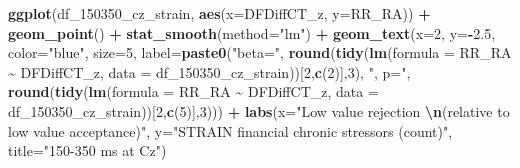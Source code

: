 \documentclass[
]{article}
\newenvironment{Shaded}{\begin{snugshade}}{\end{snugshade}}
\newcommand{\AttributeTok}[1]{\textcolor[rgb]{0.13,0.29,0.53}{#1}}
\newcommand{\DecValTok}[1]{\textcolor[rgb]{0.00,0.00,0.81}{#1}}
\newcommand{\FloatTok}[1]{\textcolor[rgb]{0.00,0.00,0.81}{#1}}
\newcommand{\FunctionTok}[1]{\textcolor[rgb]{0.13,0.29,0.53}{\textbf{#1}}}
\newcommand{\NormalTok}[1]{#1}
\newcommand{\SpecialCharTok}[1]{\textcolor[rgb]{0.81,0.36,0.00}{\textbf{#1}}}
\newcommand{\StringTok}[1]{\textcolor[rgb]{0.31,0.60,0.02}{#1}}
\begin{document}
\begin{Shaded}
\begin{Highlighting}[]
\FunctionTok{ggplot}\NormalTok{(df\_150350\_cz\_strain, }\FunctionTok{aes}\NormalTok{(}\AttributeTok{x=}\NormalTok{DFDiffCT\_z, }\AttributeTok{y=}\NormalTok{RR\_RA)) }\SpecialCharTok{+}
  \FunctionTok{geom\_point}\NormalTok{() }\SpecialCharTok{+}
  \FunctionTok{stat\_smooth}\NormalTok{(}\AttributeTok{method=}\StringTok{"lm"}\NormalTok{) }\SpecialCharTok{+}
  \FunctionTok{geom\_text}\NormalTok{(}\AttributeTok{x=}\DecValTok{2}\NormalTok{, }\AttributeTok{y=}\SpecialCharTok{{-}}\FloatTok{2.5}\NormalTok{, }\AttributeTok{color=}\StringTok{"blue"}\NormalTok{, }\AttributeTok{size=}\DecValTok{5}\NormalTok{, }\AttributeTok{label=}\FunctionTok{paste0}\NormalTok{(}\StringTok{"beta="}\NormalTok{,}
       \FunctionTok{round}\NormalTok{(}\FunctionTok{tidy}\NormalTok{(}\FunctionTok{lm}\NormalTok{(}\AttributeTok{formula =}\NormalTok{ RR\_RA }\SpecialCharTok{\textasciitilde{}}\NormalTok{ DFDiffCT\_z, }\AttributeTok{data =}\NormalTok{ df\_150350\_cz\_strain))[}\DecValTok{2}\NormalTok{,}\FunctionTok{c}\NormalTok{(}\DecValTok{2}\NormalTok{)],}\DecValTok{3}\NormalTok{),}
       \StringTok{", p="}\NormalTok{, }
       \FunctionTok{round}\NormalTok{(}\FunctionTok{tidy}\NormalTok{(}\FunctionTok{lm}\NormalTok{(}\AttributeTok{formula =}\NormalTok{ RR\_RA }\SpecialCharTok{\textasciitilde{}}\NormalTok{ DFDiffCT\_z, }\AttributeTok{data =}\NormalTok{ df\_150350\_cz\_strain))[}\DecValTok{2}\NormalTok{,}\FunctionTok{c}\NormalTok{(}\DecValTok{5}\NormalTok{)],}\DecValTok{3}\NormalTok{))) }\SpecialCharTok{+}
    \FunctionTok{labs}\NormalTok{(}\AttributeTok{x=}\StringTok{"Low value rejection }\SpecialCharTok{\textbackslash{}n}\StringTok{(relative to low value acceptance)"}\NormalTok{,}
       \AttributeTok{y=}\StringTok{"STRAIN financial chronic stressors (count)"}\NormalTok{,}
       \AttributeTok{title=}\StringTok{"150{-}350 ms at Cz"}\NormalTok{)}


\end{Highlighting}
\end{Shaded}
\end{document}
